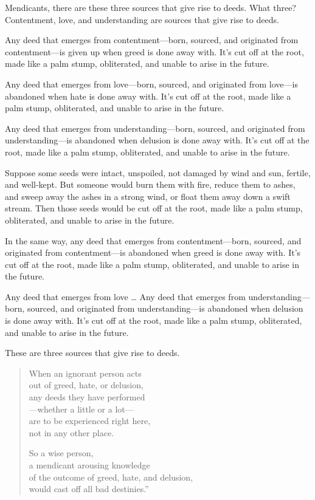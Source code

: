 \documentclass[12pt,openany]{book}%
\begin{document}
Mendicants, there are these three sources that give rise to deeds. What three? Contentment, love, and understanding are sources that give rise to deeds. 

Any deed that emerges from contentment—born, sourced, and originated from contentment—is given up when greed is done away with. It’s cut off at the root, made like a palm stump, obliterated, and unable to arise in the future. 

Any deed that emerges from love—born, sourced, and originated from love—is abandoned when hate is done away with. It’s cut off at the root, made like a palm stump, obliterated, and unable to arise in the future. 

Any deed that emerges from understanding—born, sourced, and originated from understanding—is abandoned when delusion is done away with. It’s cut off at the root, made like a palm stump, obliterated, and unable to arise in the future. 

Suppose some seeds were intact, unspoiled, not damaged by wind and sun, fertile, and well-kept. But someone would burn them with fire, reduce them to ashes, and sweep away the ashes in a strong wind, or float them away down a swift stream. Then those seeds would be cut off at the root, made like a palm stump, obliterated, and unable to arise in the future. 

In the same way, any deed that emerges from contentment—born, sourced, and originated from contentment—is abandoned when greed is done away with. It’s cut off at the root, made like a palm stump, obliterated, and unable to arise in the future. 

Any deed that emerges from love … Any deed that emerges from understanding—born, sourced, and originated from understanding—is abandoned when delusion is done away with. It’s cut off at the root, made like a palm stump, obliterated, and unable to arise in the future. 

These are three sources that give rise to deeds. 

\begin{verse}%
When an ignorant person acts \\
out of greed, hate, or delusion, \\
any deeds they have performed \\
—whether a little or a lot—\\
are to be experienced right here, \\
not in any other place. 

So a wise person, \\
a mendicant arousing knowledge \\
of the outcome of greed, hate, and delusion, \\
would cast off all bad destinies.” 

%
\end{verse}
\end{document}
